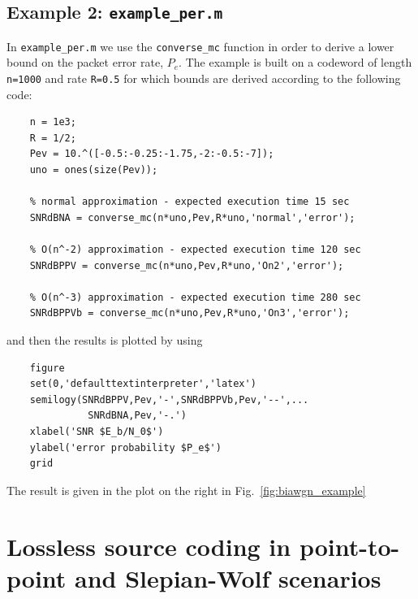 \documentclass[a4paper,11p]{memoir}
\begin{document}
\section{Example 2: \texttt{example\_per.m}}

In \verb|example_per.m| we use the \verb|converse_mc| function in order to derive a lower bound on the packet error rate, $P_e$. The example is built on a codeword of length \verb|n=1000|  and rate \verb|R=0.5| for which bounds are derived according to  the following code:
\begin{verbatim}
    n = 1e3;
    R = 1/2;
    Pev = 10.^([-0.5:-0.25:-1.75,-2:-0.5:-7]);
    uno = ones(size(Pev));

    % normal approximation - expected execution time 15 sec
    SNRdBNA = converse_mc(n*uno,Pev,R*uno,'normal','error');

    % O(n^-2) approximation - expected execution time 120 sec
    SNRdBPPV = converse_mc(n*uno,Pev,R*uno,'On2','error');

    % O(n^-3) approximation - expected execution time 280 sec
    SNRdBPPVb = converse_mc(n*uno,Pev,R*uno,'On3','error');
\end{verbatim}
and then the results is plotted by using
\begin{verbatim}
    figure
    set(0,'defaulttextinterpreter','latex')
    semilogy(SNRdBPPV,Pev,'-',SNRdBPPVb,Pev,'--',...
              SNRdBNA,Pev,'-.')
    xlabel('SNR $E_b/N_0$')
    ylabel('error probability $P_e$')
    grid
\end{verbatim}
The result is given in the plot on the right in Fig.~\ref{fig:biawgn_example}



\chapter{Lossless source coding in point-to-point and Slepian-Wolf scenarios}
\end{document}
